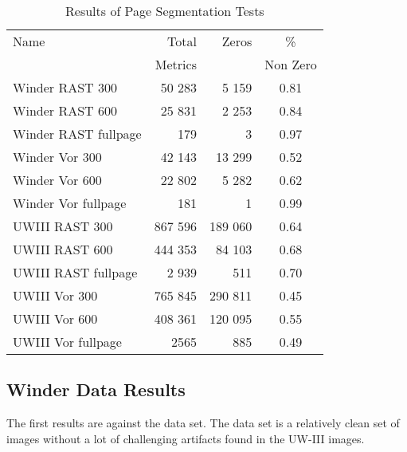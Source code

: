 \documentclass[conference]{IEEEtran}
\begin{document}
\begin{table}
\begin{center}
\caption{Results of Page Segmentation Tests}
    \begin{tabular}{| l | r | r | c | }
    \hline
    Name    &   Total   & Zeros & \% \\
            &   Metrics &       & Non Zero \\
    \hline 
    \hline 
    Winder RAST 300 & 50 283 & 5 159 & 0.81 \\
    \hline

    Winder RAST 600 & 25 831 & 2 253 & 0.84 \\
    \hline

    Winder RAST fullpage & 179 & 3 & 0.97 \\
    \hline

    Winder Vor 300 & 42 143 & 13 299 & 0.52 \\
    \hline

    Winder Vor 600 & 22 802 & 5 282 & 0.62 \\
    \hline

    Winder Vor fullpage & 181 & 1 & 0.99 \\
    \hline

    UWIII RAST 300 & 867 596 & 189 060 & 0.64 \\
    \hline

    UWIII RAST 600 & 444 353 & 84 103 & 0.68 \\
    \hline

    UWIII RAST fullpage & 2 939 & 511 & 0.70 \\
    \hline

    UWIII Vor 300 & 765 845 & 290 811 & 0.45 \\
    \hline

    UWIII Vor 600 & 408 361 & 120 095 & 0.55 \\
    \hline

    UWIII Vor fullpage & 2565 & 885 & 0.49 \\
    \hline

    \end{tabular}
\end{center}
\end{table}

%
%
\subsection{Winder Data Results}

The first results are against the \cite{winder2010extending} data set. The
\cite{winder2010extending} data set is a relatively clean set of images without a
lot of challenging artifacts found in the UW-III images.
\end{document}

